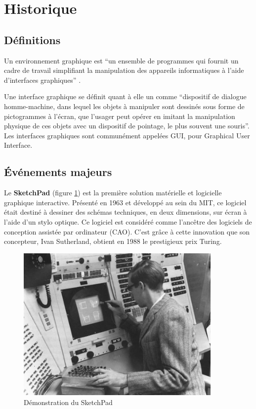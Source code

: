 \section{Historique}

\subsection{Définitions}

Un environnement graphique est ``un ensemble de programmes qui fournit un cadre de travail simplifiant la manipulation des appareils informatiques à l'aide d'interfaces graphiques'' \cite{wiki:environnementgraphique}.

Une interface graphique se définit quant à elle un comme ``dispositif de dialogue homme-machine, dans lequel les objets à manipuler sont dessinés sous forme de pictogrammes à l'écran, que l'usager peut opérer en imitant la manipulation physique de ces objets avec un dispositif de pointage, le plus souvent une souris''. Les interfaces graphiques sont communément appelées GUI, pour Graphical User Interface.

\subsection{Événements majeurs}
Le \textbf{SketchPad} (figure \ref{fig:sketchpad}) est la première solution matérielle et logicielle graphique interactive.
Présenté en 1963 et développé au sein du MIT, ce logiciel était destiné à dessiner des schémas techniques, en deux dimensions, sur écran à l'aide d'un stylo optique. Ce logiciel est considéré comme l'ancêtre des logiciels de conception assistée par ordinateur (CAO). C'est grâce à cette innovation que son concepteur, Ivan Sutherland, obtient en 1988 le prestigieux prix Turing.

\begin{figure}[H]
  \centering
    \includegraphics[width=10cm]{figures/ivan_sutherland_sketchpad.jpg}
  \caption{Démonstration du SketchPad \cite{myosnet}}
  \label{fig:sketchpad}
\end{figure}

